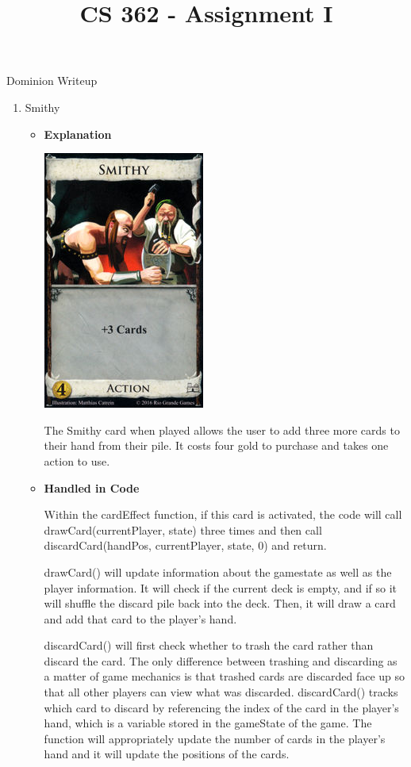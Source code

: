 \documentclass[11pt,letterpaper]{article}
\begin{document}
 \univlogo

\title{CS 362 - Assignment I}
{\Huge Dominion Writeup}\\[5mm]
\begin{enumerate}
  \item Smithy
    \begin{itemize}
      \item \textbf{Explanation}

        \includegraphics{dominion_smithy.jpg}
        
        The Smithy card when played allows the user
        to add three more cards to their hand from
        their pile. It costs four gold to purchase
        and takes one action to use. 
      \item \textbf{Handled in Code}

        Within the cardEffect function, if this
        card is activated, the code will
        call drawCard(currentPlayer, state)
        three times and then call
        discardCard(handPos, currentPlayer, state, 0)
        and return. 

        drawCard() will update information about the
        gamestate as well as the player information. 
        It will check if the current deck is empty,
        and if so it will shuffle the discard pile
        back into the deck. Then, it will draw a card 
        and add that card to the player's hand.

        discardCard() will first check whether to
        trash the card rather than discard the
        card. The only difference between trashing
        and discarding as a matter of game
        mechanics is that trashed cards are 
        discarded face up so that all other players
        can view what was discarded. discardCard()
        tracks which card to discard by referencing
        the index of the card in the player's hand, 
        which is a variable stored in the gameState
        of the game. The function will 
        appropriately update the number of cards in
        the player's hand and it will update the
        positions of the cards. 


\end{itemize}
\end{enumerate}
\end{document}

